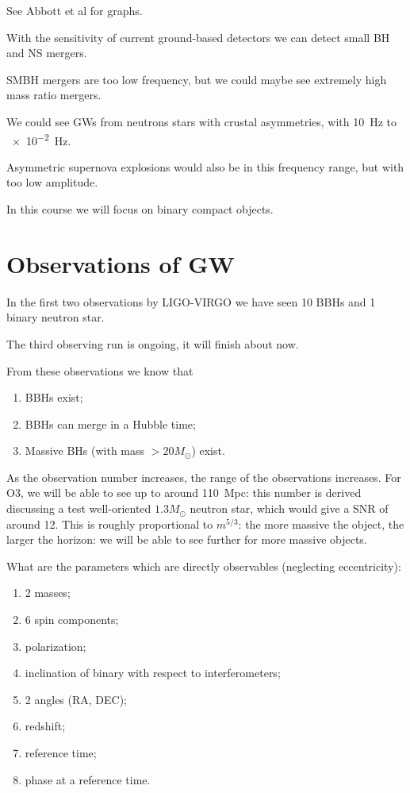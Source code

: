 \documentclass[main.tex]{subfiles}
\begin{document}
See Abbott et al \cite[]{ligoscientificcollaborationandvirgocollaborationObservationGravitationalWaves2016} for graphs. 

With the sensitivity of current ground-based detectors we can detect small BH and NS mergers. 

SMBH mergers are too low frequency, but we could maybe see extremely high mass ratio mergers. 

We could see GWs from neutrons stars with crustal asymmetries, with \SI{10}{Hz} to \SI{e-2}{Hz}.

Asymmetric supernova explosions would also be in this frequency range, but with too low amplitude. 

In this course we will focus on binary compact objects. 

\section{Observations of GW}

In the first two observations by LIGO-VIRGO we have seen 10 BBHs and 1 binary neutron star. 

The third observing run is ongoing, it will finish about now. 

From these observations we know that 
\begin{enumerate}
  \item BBHs exist;
  \item BBHs can merge in a Hubble time;
  \item Massive BHs (with mass \(>20  M_{\odot}\)) exist.
\end{enumerate}

As the observation number increases, the range of the observations increases. For O3, we will be able to see up to around \SI{110}{Mpc}: this number is derived discussing a test well-oriented \(1.3 M_{\odot}\) neutron star, which would give a SNR of around 12. 
This is roughly proportional to \(m^{5/3}\): the more massive the object, the larger the horizon: we will be able to see further for more massive objects. 

What are the parameters which are directly observables (neglecting eccentricity): 
\begin{enumerate}
  \item 2 masses;
  \item 6 spin components;
  \item polarization;
  \item inclination of binary with respect to interferometers;
  \item 2 angles (RA, DEC);
  \item redshift;
  \item reference time;
  \item phase at a reference time.
\end{enumerate}
\end{document}
